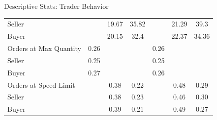 \documentclass[10pt]{beamer}
\begin{document}
\begin{frame}{Descriptive Stats: Trader Behavior}
\begin{table}[t]
{\begin{threeparttable}
\begin{tabular}{lccc|ccc}
    \hspace{3mm}Seller              &          & 19.67         & 35.82         &           & 21.29         & 39.3          \\
    \hspace{3mm}Buyer               &          & 20.15         & 32.4          &           & 22.37         & 34.36         \\
   \hline
    Orders at Max Quantity          & 0.26     &               &               & 0.26      &               &               \\
    \hspace{3mm}Seller              & 0.25     &               &               & 0.25      &               &               \\
    \hspace{3mm}Buyer               & 0.27     &               &               & 0.26      &               &               \\
   \hline
    Orders at Speed Limit      &          & 0.38          & 0.22          &           & 0.48          & 0.29          \\
    \hspace{3mm}Seller              &          & 0.38          & 0.23          &           & 0.46          & 0.30           \\
    \hspace{3mm}Buyer               &          & 0.39          & 0.21          &           & 0.49          & 0.27          \\
    \bottomrule
    \end{tabular}
\end{threeparttable}
}
\end{table}

\end{frame}
\end{document}

